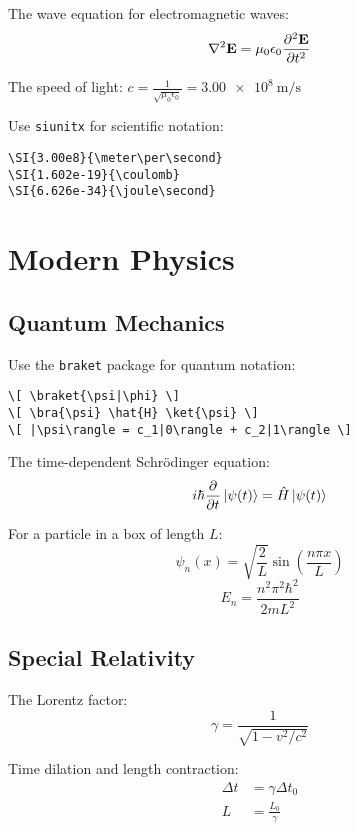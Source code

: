 \documentclass[11pt]{book}
\begin{document}
The wave equation for electromagnetic waves:
\[ \nabla^2 \mathbf{E} = \mu_0\epsilon_0 \frac{\partial^2 \mathbf{E}}{\partial t^2} \]

The speed of light: $c = \frac{1}{\sqrt{\mu_0\epsilon_0}} = \SI{3.00e8}{\meter\per\second}$

\begin{tutorialbox}[title=Scientific Notation with siunitx]
Use \texttt{siunitx} for scientific notation:
\begin{verbatim}
\SI{3.00e8}{\meter\per\second}
\SI{1.602e-19}{\coulomb}
\SI{6.626e-34}{\joule\second}
\end{verbatim}
\end{tutorialbox}

\chapter{Modern Physics}

\section{Quantum Mechanics}

\begin{tutorialbox}[title=Quantum Mechanics Notation]
Use the \texttt{braket} package for quantum notation:
\begin{verbatim}
\[ \braket{\psi|\phi} \]
\[ \bra{\psi} \hat{H} \ket{\psi} \]
\[ |\psi\rangle = c_1|0\rangle + c_2|1\rangle \]
\end{verbatim}
\end{tutorialbox}

The time-dependent Schrödinger equation:
\[ i\hbar \frac{\partial}{\partial t} \ket{\psi(t)} = \hat{H} \ket{\psi(t)} \]

For a particle in a box of length $L$:
\[ \psi_n(x) = \sqrt{\frac{2}{L}} \sin\left(\frac{n\pi x}{L}\right) \]
\[ E_n = \frac{n^2\pi^2\hbar^2}{2mL^2} \]

\section{Special Relativity}

The Lorentz factor:
\[ \gamma = \frac{1}{\sqrt{1 - v^2/c^2}} \]

Time dilation and length contraction:
\begin{align}
    \Delta t &= \gamma \Delta t_0 \\
    L &= \frac{L_0}{\gamma}
\end{align}
\end{document}
